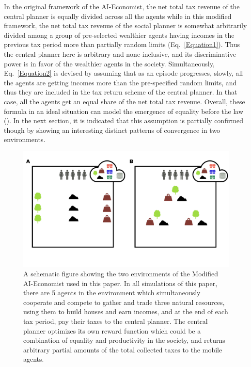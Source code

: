 \documentclass{article}
\begin{document}
In the original framework of the AI-Economist, the net total tax revenue of the central planner is equally divided across all the agents while in this modified framework, the net total tax revenue of the social planner is somewhat arbitrarily divided among a group of pre-selected wealthier agents \textendash having incomes in the previous tax period more than partially random limits (Eq.~\ref{Equation1}). Thus the central planner here is arbitrary and none-inclusive, and its discriminative power is in favor of the wealthier agents in the society. Simultaneously, Eq.~\ref{Equation2} is devised by assuming that as an episode progresses, slowly, all the agents are getting incomes more than the pre-specified random limits, and thus they are included in the tax return scheme of the central planner. In that case, all the agents get an equal share of the net total tax revenue. Overall, these formula \textendash in an ideal situation \textendash can model the emergence of equality before the law (\citep{Acemoglu2020}). In the next section, it is indicated that this assumption is partially confirmed though by showing an interesting distinct patterns of convergence in two environments.

\begin{figure}
	\centering
	\includegraphics[width=0.7\linewidth]{"A_Multi-agent_Reinforcement_Learning_Study_of_Emergence_of_Social_Classes_out_of_Arbitrary_Governance_The_Role_of_Environment_Slides_1/A_Multi-agent_Reinforcement_Learning_Study_of_Emergence_of_Social_Classes_out_of_Arbitrary_Governance_The_Role_of_Environment_Slides_1.001"}
	\caption{A schematic figure showing the two environments of the Modified AI-Economist used in this paper. In all simulations of this paper, there are 5 agents in the environment which simultaneously cooperate and compete to gather and trade three natural resources, using them to build houses and earn incomes, and at the end of each tax period, pay their taxes to the central planner. The central planner optimizes its own reward function which could be a combination of equality and productivity in the society, and returns arbitrary partial amounts of the total collected taxes to the mobile agents.}
	\label{Figure1}
\end{figure}
\end{document}
